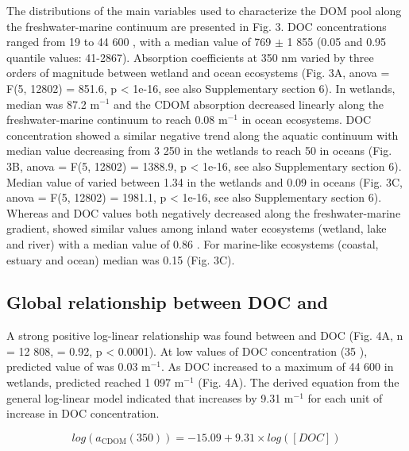 The distributions of the main variables used to characterize the DOM pool along the freshwater-marine continuum are presented in Fig. 3. DOC concentrations ranged from 19 to 44 600 \mmol, with a median value of 769 $\pm$ 1 855 \mmol (0.05 and 0.95 quantile values: 41-2867). Absorption coefficients at 350 nm varied by three orders of magnitude between wetland and ocean ecosystems (Fig. 3A, anova = F(5, 12802) = 851.6, p < 1e-16, see also Supplementary section 6). In wetlands, median  was 87.2 m$^{-1}$ and the CDOM absorption decreased linearly along the freshwater-marine continuum to reach 0.08 m$^{-1}$ in ocean ecosystems. DOC concentration showed a similar negative trend along the aquatic continuum with median value decreasing from 3 250 \mmol in the wetlands to reach 50 \mmol in oceans (Fig. 3B, anova = F(5, 12802) = 1388.9, p < 1e-16, see also Supplementary section 6). Median value of  varied between 1.34 \suvagram in the wetlands and 0.09 \suvagram in oceans (Fig. 3C, anova = F(5, 12802) = 1981.1, p < 1e-16, see also Supplementary section 6). Whereas  and DOC values both negatively decreased along the freshwater-marine gradient,  showed similar values among inland water ecosystems (wetland, lake and river) with a median value of 0.86 \suvagram. For marine-like ecosystems (coastal, estuary and ocean) median  was 0.15 \suvagram (Fig. 3C).

\subsection*{Global relationship between DOC and }

A strong positive log-linear relationship was found between  and DOC (Fig. 4A, n = 12 808, \rr = 0.92, p < 0.0001). At low values of DOC concentration (35 \mmol), predicted value of  was 0.03 m$^{-1}$. As DOC increased to a maximum of 44 600 \mmol in wetlands, predicted  reached 1 097 m$^{-1}$ (Fig. 4A). The derived equation from the general log-linear model indicated that  increases by 9.31 m$^{-1}$ for each unit of increase in DOC concentration. 

\begin{equation}
  log(a_{\text{CDOM}}(350)) = -15.09 + 9.31 \times log([DOC])
\end{equation}

